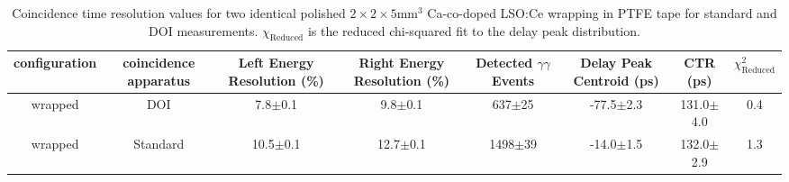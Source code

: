 \begin{table}
\caption{\label{tab:referencevals} Coincidence time resolution values for two identical polished $2\times2\times5$mm$^3$ Ca-co-doped LSO:Ce wrapping in PTFE tape for standard and DOI measurements. $\chi_\text{Reduced}$ is the reduced chi-squared fit to the delay peak distribution.}
\begin{tabular}{cccccccc}
configuration &  coincidence apparatus & Left Energy Resolution (\%) & Right Energy Resolution (\%) & Detected $\gamma\gamma$ Events & Delay Peak Centroid (ps) & CTR (ps) &  $\chi^2_\text{Reduced}$ \\
\hline
      wrapped &     DOI &   7.8$\pm$0.1 &   9.8$\pm$0.1 &   637$\pm$25 &   -77.5$\pm$2.3 &  131.0$\pm$4.0 &        0.4 \\
      wrapped &   Standard &  10.5$\pm$0.1 &  12.7$\pm$0.1 &  1498$\pm$39 &   -14.0$\pm$1.5 &  132.0$\pm$2.9 &        1.3 \\
\hline
\end{tabular}
\end{table}
